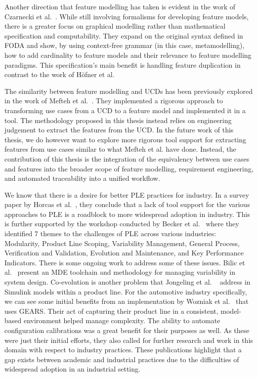 Another direction that feature modelling has taken is evident in the work of Czarnecki et al.~\cite{czarnecki2004staged}. While still involving formalisms for developing feature models, there is a greater focus on graphical modelling rather than mathematical specification and computability. They expand on the original syntax defined in FODA and show, by using context-free grammar (in this case, metamodelling), how to add cardinality to feature models and their relevance to feature modelling paradigms. This specification's main benefit is handling feature duplication in contrast to the work of H\"{o}fner et al.

The similarity between feature modelling and \gls{UCD}s has been previously explored in the work of Mefteh et al.~\cite{mefteh2015implementation}. They implemented a rigorous approach to transforming use cases from a \gls{UCD} to a feature model and implemented it in a tool. The methodology proposed in this thesis instead relies on engineering judgement to extract the features from the \gls{UCD}. In the future work of this thesis, we do however want to explore more rigorous tool support for extracting features from use cases similar to what Mefteh et al. have done. Instead, the contribution of this thesis is the integration of the equivalency between use cases and features into the broader scope of feature modelling, requirement engineering, and automated traceability into a unified workflow.

We know that there is a desire for better \gls{PLE} practices for industry. In a survey paper by Horcas et al.~\cite{horcas2019software}, they conclude that a lack of tool support for the various approaches to \gls{PLE} is a roadblock to more widespread adoption in industry. This is further supported by the workshop conducted by Becker et al.~\cite{becker2024not} where they identified 7 themes to the challenges of \gls{PLE} across various industries: Modularity, Product Line Scoping, Variability Management, General Process, Verification and Validation, Evolution and Maintenance, and Key Performance Indicators. There is some ongoing work to address some of these issues. Bilic et al.~\cite{bilic2019integrated} present an \gls{MDE} toolchain and methodology for managing variability in system design. Co-evolution is another problem that Jongeling et al. ~\cite{jongeling2020co} address in Simulink models within a product line. For the automotive industry specifically, we can see some initial benefits from an implementation by Wozniak et al.~\cite{10.1145/2791060.2791071} that uses GEARS. Their act of capturing their product line in a consistent, model-based environment helped manage complexity. The ability to automate configuration calibrations was a great benefit for their purposes as well. As these were just their initial efforts, they also called for further research and work in this domain with respect to industry practices. These publications highlight that a gap exists between academic and industrial practices due to the difficulties of widespread adoption in an industrial setting.

